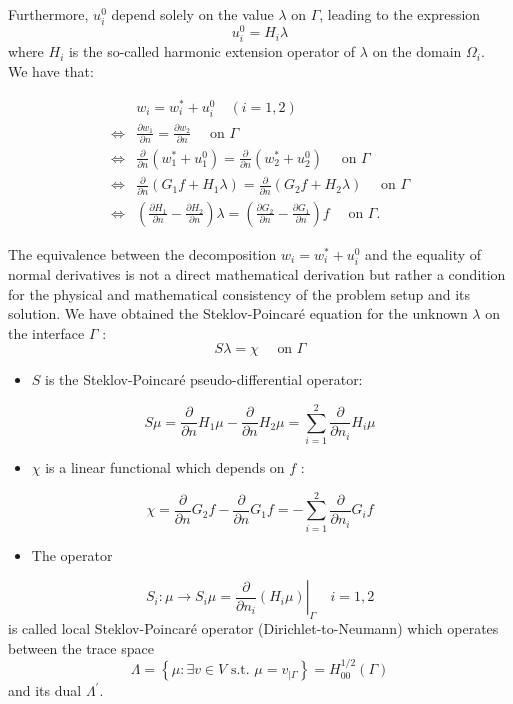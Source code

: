 \documentclass[11pt]{book}
\begin{document}
Furthermore, \( u_{i}^{0} \) depend solely on the value \( \lambda \) on \( \Gamma \), leading to the expression
\[ u_{i}^{0} = H_{i} \lambda \]
where \( H_{i} \) is the so-called harmonic extension operator of \( \lambda \) on the domain \( \Omega_{i} \).\\
We have that:

\begin{align*}
 & w_{i}=w_{i}^{*}+u_{i}^{0} \quad(i=1,2) \\ 
\Leftrightarrow & \frac{\partial w_{1}}{\partial n}=\frac{\partial w_{2}}{\partial n} \quad \text { on } \Gamma \\ 
\Leftrightarrow & \frac{\partial}{\partial n}\left(w_{1}^{*}+u_{1}^{0}\right)=\frac{\partial}{\partial n}\left(w_{2}^{*}+u_{2}^{0}\right) \quad \text { on } \Gamma \\ 
\Leftrightarrow & \frac{\partial}{\partial n}\left(G_{1} f+H_{1} \lambda\right)=\frac{\partial}{\partial n}\left(G_{2} f+H_{2} \lambda\right) \quad \text { on } \Gamma \\ 
\Leftrightarrow & \left(\frac{\partial H_{1}}{\partial n}-\frac{\partial H_{2}}{\partial n}\right) \lambda=\left(\frac{\partial G_{2}}{\partial n}-\frac{\partial G_{1}}{\partial n}\right) f \quad \text { on } \Gamma .
\end{align*}

The equivalence between the decomposition \( w_i = w_i^* + u_i^0 \) and the equality of normal derivatives is not a direct mathematical derivation but rather a condition for the physical and mathematical consistency of the problem setup and its solution.
We have obtained the Steklov-Poincaré equation for the unknown $\lambda$ on the interface $\Gamma$ :
$$
S \lambda=\chi \quad \text { on } \Gamma
$$
\begin{itemize}
  \item $S$ is the Steklov-Poincaré pseudo-differential operator:
\end{itemize}
$$
S \mu=\frac{\partial}{\partial n} H_{1} \mu-\frac{\partial}{\partial n} H_{2} \mu=\sum_{i=1}^{2} \frac{\partial}{\partial n_{i}} H_{i} \mu
$$
\begin{itemize}
  \item $\chi$ is a linear functional which depends on $f$ :
\end{itemize}
$$
\chi=\frac{\partial}{\partial n} G_{2} f-\frac{\partial}{\partial n} G_{1} f=-\sum_{i=1}^{2} \frac{\partial}{\partial n_{i}} G_{i} f
$$
\begin{itemize}
  \item The operator
\end{itemize}
$$
S_{i}: \mu \rightarrow S_{i} \mu=\left.\frac{\partial}{\partial n_{i}}\left(H_{i} \mu\right)\right|_{\Gamma} \quad i=1,2
$$
is called local Steklov-Poincaré operator (Dirichlet-to-Neumann) which operates between the trace space
$$
\Lambda=\left\{\mu: \exists v \in V \text { s.t. } \mu=v_{\mid \Gamma}\right\}=H_{00}^{1 / 2}(\Gamma)
$$
and its dual $\Lambda^{\prime}$.
\end{document}
